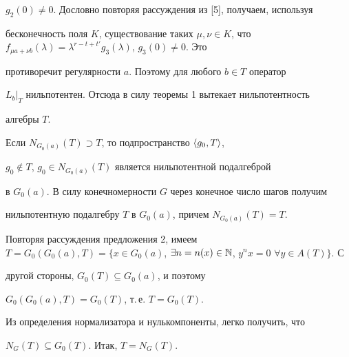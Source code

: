 \begin{pf}
$g_2(0)\ne0$. Дословно повторяя рассуждения из [5], получаем, используя 


бесконечность поля $K$, существование таких $\mu,\nu\in K$, что $f_{\mu 


a+\nu b}(\lambda)= \lambda^{r-t+t'}g_3(\lambda)$, $g_3(0)\ne0$. Это 


противоречит регулярности $a$. Поэтому для любого $b\in T$ оператор 


$L_b|_T$ нильпотентен. Отсюда в силу теоремы 1 вытекает нильпотентность 


алгебры $T$.  


 


Если $N_{G_0(a)}(T)\supset T$, то подпространство $\langle g_0,T\rangle$, 


$g_0\notin T$, $g_0\in N_{G_0(a)}(T)$ является нильпотентной подалгеброй 


в $G_0(a)$. В силу конечномерности $G$ через конечное число шагов получим 


нильпотентную подалгебру $T$ в $G_0(a)$, причем $N_{G_0(a)}(T)=T$. 


Повторяя рассуждения предложения 2, имеем $T=G_0(G_0(a),T)=\{x\in 


G_0(a)$, $\exists n=n(x)\in\Bbb N$, $y^n x=0$ $\forall y\in A(T)\}$. С 


другой стороны, $G_0(T)\subseteq G_0(a)$, и поэтому 


$G_0(G_0(a),T)=G_0(T)$, т.\,е. $T=G_0(T)$.  


 


Из определения нормализатора и нулькомпоненты, легко получить, что 


$N_G(T)\subseteq G_0(T)$. Итак, $T=N_G(T)$.  


\end{pf} 


 


 


 


